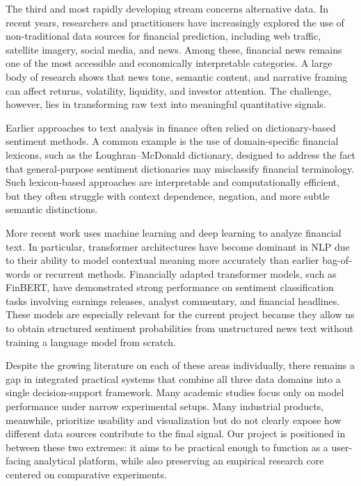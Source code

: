 \documentclass[12pt,a4paper]{article}
\begin{document}
The third and most rapidly developing stream concerns alternative data. In recent years, researchers and practitioners have increasingly explored the use of non-traditional data sources for financial prediction, including web traffic, satellite imagery, social media, and news. Among these, financial news remains one of the most accessible and economically interpretable categories. A large body of research shows that news tone, semantic content, and narrative framing can affect returns, volatility, liquidity, and investor attention. The challenge, however, lies in transforming raw text into meaningful quantitative signals.

Earlier approaches to text analysis in finance often relied on dictionary-based sentiment methods. A common example is the use of domain-specific financial lexicons, such as the Loughran--McDonald dictionary, designed to address the fact that general-purpose sentiment dictionaries may misclassify financial terminology. Such lexicon-based approaches are interpretable and computationally efficient, but they often struggle with context dependence, negation, and more subtle semantic distinctions.

More recent work uses machine learning and deep learning to analyze financial text. In particular, transformer architectures have become dominant in NLP due to their ability to model contextual meaning more accurately than earlier bag-of-words or recurrent methods. Financially adapted transformer models, such as FinBERT, have demonstrated strong performance on sentiment classification tasks involving earnings releases, analyst commentary, and financial headlines. These models are especially relevant for the current project because they allow us to obtain structured sentiment probabilities from unstructured news text without training a language model from scratch.

Despite the growing literature on each of these areas individually, there remains a gap in integrated practical systems that combine all three data domains into a single decision-support framework. Many academic studies focus only on model performance under narrow experimental setups. Many industrial products, meanwhile, prioritize usability and visualization but do not clearly expose how different data sources contribute to the final signal. Our project is positioned in between these two extremes: it aims to be practical enough to function as a user-facing analytical platform, while also preserving an empirical research core centered on comparative experiments.
\end{document}
